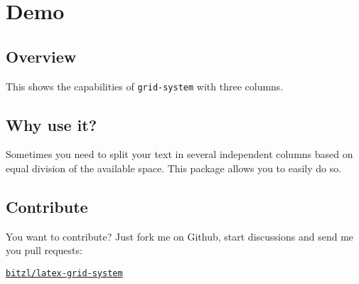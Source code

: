 \documentclass[DIV12]{scrartcl}
\begin{document}
\section{Demo}
\blindtext

\bigskip

\begin{row}[cellsep=0.5cm]{3}
	\begin{cell}{1}
	\section*{Overview}
	\vspace{-1.5ex}
	This shows the capabilities of \texttt{grid-system} with three columns.
	\end{cell}
	\begin{cell}{1}
	\section*{Why use it?}
	\vspace{-1.5ex}
	Sometimes you need to split your text in several independent columns based on equal division of the available space. This package allows you to easily do so.
	\end{cell}
	\begin{cell}{1}
	\section*{Contribute}
	\vspace{-1.5ex}
	You want to contribute? Just fork me on Github, start discussions and send me you pull requests: %
	\begin{center}
	\href{https://github.com/bitzl/latex-grid-system}{\tt bitzl/latex-grid-system}
	\end{center}
	\end{cell}
\end{row}

\bigskip
\end{document}
